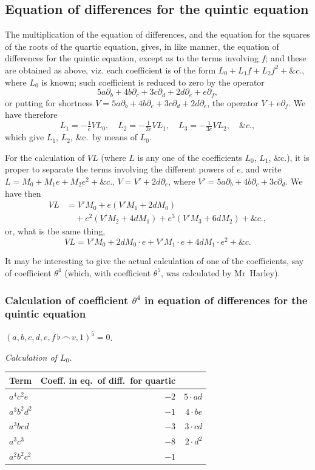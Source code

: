 \documentclass[11pt,a4paper]{book}
\begin{document}
\subsection*{Equation of differences for the quintic equation}

The multiplication of the equation of differences, and the equation for the squares of the roots of the quartic equation, gives, in like manner, the equation of differences for the quintic equation, except as to the terms involving $f$; and these are obtained as above, viz. each coefficient is of the form $L_0+L_1f+L_2f^2+\&c.$, where $L_0$ is known; such coefficient is reduced to zero by the operator
\[
5a\partial_b+4b\partial_c+3c\partial_d+2d\partial_e+e\partial_f,
\]
or putting for shortness $V=5a\partial_b+4b\partial_c+3c\partial_d+2d\partial_e$, the operator $V+e\partial_f$. We have therefore
\[
L_1=-\tfrac{1}{e}VL_0,\quad L_2=-\tfrac{1}{2e}VL_1,\quad L_3=-\tfrac{1}{3e}VL_2,\quad \&c.,
\]
which give $L_1$, $L_2$, \&c.\ by means of $L_0$.

For the calculation of $VL$ (where $L$ is any one of the coefficients $L_0$, $L_1$, \&c.), it is proper to separate the terms involving the different powers of $e$, and write $L=M_0+M_1e+M_2e^2+\&c.$, $V=V'+2d\partial_e$, where $V'=5a\partial_b+4b\partial_c+3c\partial_d$. We have then
\begin{align*}
VL &= V'M_0+e(V'M_1+2dM_0)\\
&\quad+e^2(V'M_2+4dM_1)+e^3(V'M_3+6dM_2)+\&c.,
\end{align*}
or, what is the same thing,
\[
VL=V'M_0+2dM_0\cdot e+V'M_1\cdot e+4dM_1\cdot e^2+\&c.
\]

It may be interesting to give the actual calculation of one of the coefficients, say of coefficient $\theta^4$ (which, with coefficient $\theta^5$, was calculated by Mr~Harley).

\subsubsection*{Calculation of coefficient $\theta^4$ in equation of differences for the quintic equation}

$(a,b,c,d,e,f\,\flat\,\frown\, v,1)^5=0$.

\textit{Calculation of $L_0$.}
\begin{center}
\begin{tabular}{lrr}
\toprule
Term & Coeff. in eq.\ of diff.\ for quartic & \\
\midrule
$a^4c^2e$ & $-2$ & $5\cdot ad$\\
$a^3b^2d^2$ & $-1$ & $4\cdot be$\\
$a^3bcd$ & $-3$ & $3\cdot cd$\\
$a^3c^3$ & $-8$ & $2\cdot d^2$\\
$a^2b^2c^2$ & $-1$ & \\
\bottomrule
\end{tabular}
\end{center}
\end{document}

